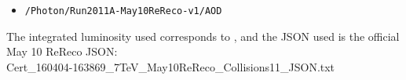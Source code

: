 \begin{itemize}
\item \verb=/Photon/Run2011A-May10ReReco-v1/AOD=
\end{itemize}

The integrated luminosity used corresponds to \lumi, and the JSON used is 
the official May 10 ReReco JSON:
\\
Cert\_160404-163869\_7TeV\_May10ReReco\_Collisions11\_JSON.txt

